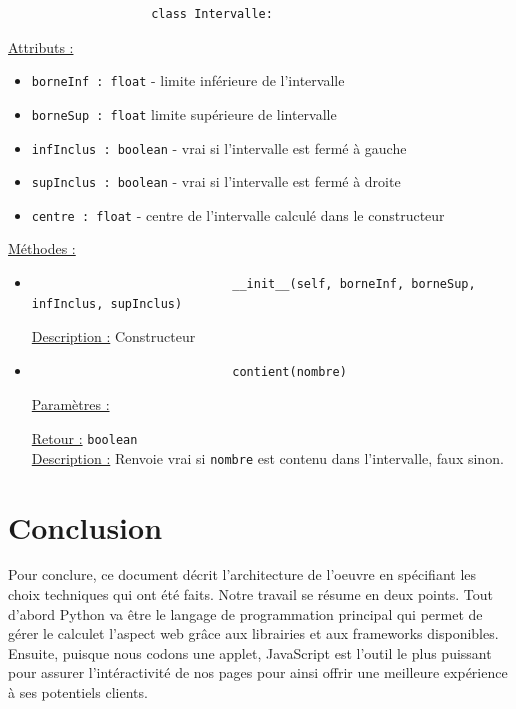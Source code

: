 \begin{itemize}
				\begin{lstlisting}
					class Intervalle:
				\end{lstlisting}
				\underline{Attributs :}
					\begin{itemize}
						\item \lstinline!borneInf : float! - limite inférieure de l'intervalle
						\item \lstinline!borneSup : float! limite supérieure de lintervalle
						\item \lstinline!infInclus : boolean! - vrai si l'intervalle est fermé à gauche
						\item \lstinline!supInclus : boolean! - vrai si l'intervalle est fermé à droite
						\item \lstinline!centre : float! - centre de l'intervalle calculé dans le constructeur
					\end{itemize}
				\underline{Méthodes :}
					\begin{itemize}
						\vspace{1em}\item
						\begin{lstlisting}
							__init__(self, borneInf, borneSup, infInclus, supInclus)
						\end{lstlisting}
						\underline{Description :} Constructeur
						
						\vspace{1em}\item
						\begin{lstlisting}
							contient(nombre)
						\end{lstlisting}
						\underline{Paramètres :}
							\begin{description}[style=unboxed,leftmargin=0.2cm]
								\item \lstinline!nombre : float!
							\end{description}
						\underline{Retour :} \lstinline!boolean!\\
						\underline{Description :} Renvoie vrai si \lstinline!nombre! est contenu dans l'intervalle, faux sinon.
					\end{itemize}
 		\end{itemize}
	
	\section*{Conclusion}
		Pour conclure, ce document décrit l'architecture de l'oeuvre en spécifiant les choix techniques qui ont été faits. Notre travail se résume en deux points. Tout d'abord Python va être le langage de programmation principal qui permet de gérer le calculet l'aspect web grâce aux librairies et aux frameworks disponibles. Ensuite, puisque nous codons une applet, JavaScript est l'outil le plus puissant pour assurer l'intéractivité de nos pages pour ainsi offrir une meilleure expérience à ses potentiels clients.\\
			
